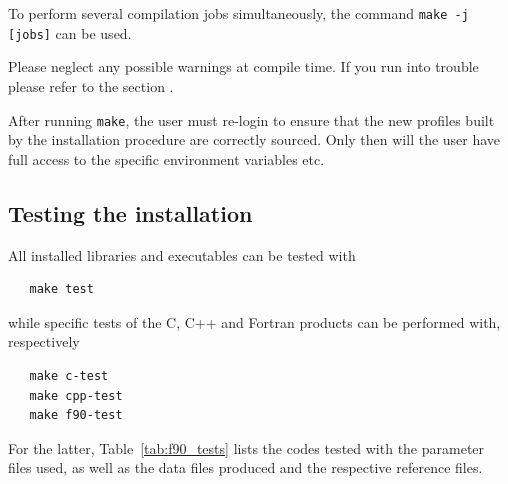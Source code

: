 \documentclass[12pt,twoside]{article}
\begin{document}
To perform several compilation jobs simultaneously, the command {\tt make -j [jobs]}
can be used.

Please neglect any possible warnings at compile time. If you run into
trouble please refer to the section .

After running {\tt make}, the user must re-login to ensure that the new profiles built by the installation
procedure are correctly sourced. Only then will the
user have full access to the specific \healpix
environment variables etc.

\subsection{Testing the installation}

All installed libraries and executables can be tested with 
\begin{verbatim}
   make test
\end{verbatim}

while specific tests of the C, C++ and Fortran products can be performed with,
respectively
\begin{verbatim}
   make c-test
   make cpp-test
   make f90-test
\end{verbatim}
For the latter, Table~\ref{tab:f90_tests} lists the codes tested with the
parameter files used, as well as the data files produced and the respective
reference files.
\end{document}
